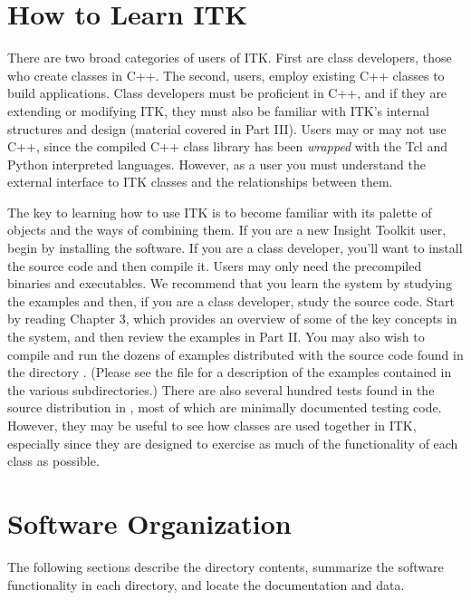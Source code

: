 \section{How to Learn ITK}
\label{sec:HowToLearnITK}

There are two broad categories of users of ITK. First are class
developers, those who create classes in C++. The second, users, employ
existing C++ classes to build applications. Class developers must be
proficient in C++, and if they are extending or modifying ITK, they
must also be familiar with ITK's internal structures and design
(material covered in Part III). Users may or may not use C++, since
the compiled C++ class library has been \emph{wrapped} with the Tcl
and Python interpreted languages. However, as a user you must
understand the external interface to ITK classes and the relationships
between them.

The key to learning how to use ITK is to become familiar with its palette of
objects and the ways of combining them. If you are a new Insight
Toolkit user, begin by installing the software. If you are a class
developer, you'll want to install the source code and then compile it. Users
may only need the precompiled binaries and executables. We recommend that you
learn the system by studying the examples and then, if you are a class
developer, study
the source code. Start by reading Chapter 3,
which provides an overview of some of the key concepts in the system, and
then review the examples in Part II. You may also wish to compile and run the
dozens of examples distributed with the source code found in the directory
. (Please see the file
 for
a description of the examples contained in the various subdirectories.) There
are also several hundred tests found in the source distribution in
, most of which are minimally documented
testing code. However, they may be useful to see how classes are used
together in ITK, especially since they are designed to exercise as
much of the functionality of each class as possible.

\section{Software Organization}
\label{sec:SoftwareOrganization}

The following sections describe the directory contents, summarize the
software functionality in each directory, and locate the documentation and
data.

